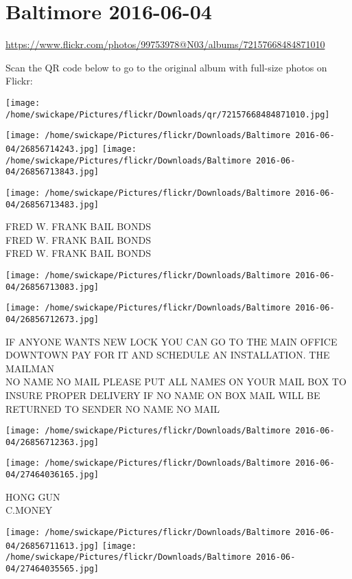 \documentclass[10pt,letterpaper]{article}
\title{}
\author{}
\date{}
\begin{document}
\section*{Baltimore 2016-06-04}

\url{https://www.flickr.com/photos/99753978@N03/albums/72157668484871010}

Scan the QR code below to go to the original album with full-size photos on Flickr:

\texttt{[image: /home/swickape/Pictures/flickr/Downloads/qr/72157668484871010.jpg]}
\pagebreak

\texttt{[image: /home/swickape/Pictures/flickr/Downloads/Baltimore 2016-06-04/26856714243.jpg]}
\texttt{[image: /home/swickape/Pictures/flickr/Downloads/Baltimore 2016-06-04/26856713843.jpg]}

\texttt{[image: /home/swickape/Pictures/flickr/Downloads/Baltimore 2016-06-04/26856713483.jpg]}

FRED W. FRANK BAIL BONDS\\
FRED W. FRANK BAIL BONDS\\
FRED W. FRANK BAIL BONDS
\pagebreak

\texttt{[image: /home/swickape/Pictures/flickr/Downloads/Baltimore 2016-06-04/26856713083.jpg]}

\vspace{0.25in}
\texttt{[image: /home/swickape/Pictures/flickr/Downloads/Baltimore 2016-06-04/26856712673.jpg]}

IF ANYONE WANTS NEW LOCK YOU CAN GO TO THE MAIN OFFICE DOWNTOWN PAY FOR IT AND SCHEDULE AN INSTALLATION. THE MAILMAN\\
NO NAME NO MAIL PLEASE PUT ALL NAMES ON YOUR MAIL BOX TO INSURE PROPER DELIVERY IF NO NAME ON BOX MAIL WILL BE RETURNED TO SENDER NO NAME NO MAIL
\pagebreak

\texttt{[image: /home/swickape/Pictures/flickr/Downloads/Baltimore 2016-06-04/26856712363.jpg]}

\vspace{0.25in}
\texttt{[image: /home/swickape/Pictures/flickr/Downloads/Baltimore 2016-06-04/27464036165.jpg]}

HONG GUN\\
C.MONEY
\pagebreak

\texttt{[image: /home/swickape/Pictures/flickr/Downloads/Baltimore 2016-06-04/26856711613.jpg]}
\texttt{[image: /home/swickape/Pictures/flickr/Downloads/Baltimore 2016-06-04/27464035565.jpg]}
\end{document}
